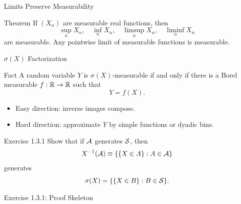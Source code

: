 \begin{frame}[shrink=5]{Limits Preserve Measurability}
  \begin{block}{Theorem}
    If $(X_n)$ are measurable real functions, then
    \[
      \sup_n X_n,\quad \inf_n X_n,\quad \limsup_n X_n,\quad \liminf_n X_n
    \]
    are measurable. Any pointwise limit of measurable functions is measurable.
  \end{block}
\end{frame}

\begin{frame}{$\sigma(X)$ Factorization}
  \begin{block}{Fact}
    A random variable $Y$ is $\sigma(X)$-measurable if and only if there is a Borel measurable $f:\mathbb{R}\to\mathbb{R}$ such that
    \[
      Y=f(X).
    \]
  \end{block}
  \begin{itemize}
    \item Easy direction: inverse images compose.
    \item Hard direction: approximate $Y$ by simple functions or dyadic bins.
  \end{itemize}
\end{frame}

\begin{frame}{Exercise 1.3.1}
  Show that if $\mathcal{A}$ generates $\mathcal{S}$, then
  \[
    X^{-1}(\mathcal{A})\equiv \{\{X\in A\}:A\in\mathcal{A}\}
  \]
  generates
  \[
    \sigma(X)=\{\{X\in B\}:B\in\mathcal{S}\}.
  \]
\end{frame}

\begin{frame}{Exercise 1.3.1: Proof Skeleton}
\end{frame}

